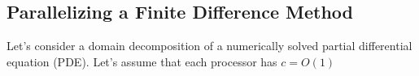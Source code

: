 \subsection{Parallelizing a Finite Difference Method}
\begin{comment}
\begin{tikzpicture}
\draw (-1.5,0) -- (1.5,0);
\draw (0,-1.5) -- (0,1.5);
\end{tikzpicture}.

\begin{tikzpicture}
\begin{scope}[every node/.style={circle,thick,draw}]
    \node (A) at (0,0) {A};
    \node (B) at (0,3) {B};
    \node (C) at (2.5,4) {C};
    \node (D) at (2.5,1) {D};
    \node (E) at (2.5,-3) {E};
    \node (F) at (5,3) {F} ;
\end{scope}

\begin{scope}[>={stealth[black]},
              every node/.style={fill=white,circle},
              every edge/.style={draw=red,very thick}]
    \path [->] (A) edge node {$5$} (B);
    \path [->] (B) edge node {$3$} (C);
    \path [->] (A) edge node {$4$} (D);
    \path [->] (D) edge node {$3$} (C);
    \path [->] (A) edge node {$3$} (E);
    \path [->] (D) edge node {$3$} (E);
    \path [->] (D) edge node {$3$} (F);
    \path [->] (C) edge node {$5$} (F);
    \path [->] (E) edge node {$8$} (F); 
    \path [->] (B) edge[bend right=60] node {$1$} (E); 
\end{scope}
\end{tikzpicture}

\begin{tikzpicture}[
  thick,
  myrect/.style={
    draw,
    fill=myyellow,
    rectangle split,
    rectangle split parts=#1,
    rectangle split part align=left
    },
  myrect2/.style={
    draw,
    fill=myyellow,
    rectangle split,
    rectangle split draw splits=false,
    rectangle split part align=left
    },  
  mycallout/.style={
    shape=rectangle callout,
    rounded corners,
    fill=mysalmon,
    callout absolute pointer={#1},
    callout pointer width=1cm
  }  
]
\node[myrect=6,text width=1em,align=center]
  (numbers)
  {
  \strut 2
  \nodepart{two}\strut 1
  \nodepart{three}\strut 3
  \nodepart{four}\strut 3
  \nodepart{five}\strut 2
  \nodepart{six}\strut 0
  };
\end{tikzpicture}
\end{comment}
Let's consider a domain decomposition of a numerically solved partial
differential equation (PDE). Let's assume that each processor has $c = O(1)$

